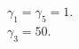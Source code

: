 \documentclass[preview]{standalone}
\begin{document}
\begin{center}
$\gamma_1 = \gamma_5 = 1.$\\$\gamma_3 = 50.$
\end{center}
\end{document}
